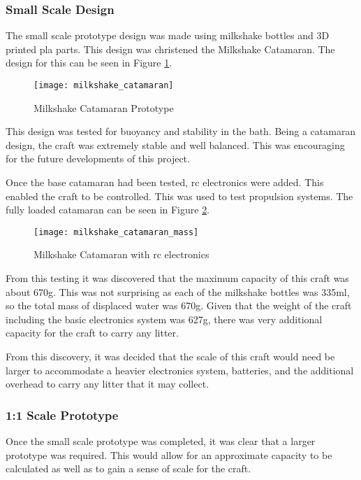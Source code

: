 \documentclass [11pt]{article}
\begin{document}
\subsubsection{Small Scale Design}

The small scale prototype design was made using milkshake bottles and 3D printed \gls{pla} parts. This design was christened the Milkshake Catamaran. The design for this can be seen in Figure \ref{fig:milkshake_catamaran}.

\begin{figure}[H]
\centerline{\texttt{[image: milkshake\_catamaran]}}
\caption{Milkshake Catamaran Prototype}
\label{fig:milkshake_catamaran}
\end{figure}

This design was tested for buoyancy and stability in the bath. Being a \gls{catamaran} design, the craft was extremely stable and well balanced. This was encouraging for the future developments of this project. 

Once the base catamaran had been tested, \gls{rc} electronics were added. This enabled the craft to be controlled. This was used to test propulsion systems. The fully loaded \gls{catamaran} can be seen in Figure \ref{fig:milkshake_catamaran_mass}.   

\begin{figure}[H]
\centerline{\texttt{[image: milkshake\_catamaran\_mass]}}
\caption{Milkshake Catamaran with \gls{rc} electronics}
\label{fig:milkshake_catamaran_mass}
\end{figure}

From this testing it was discovered that the maximum capacity of this craft was about 670g. This was not surprising as each of the milkshake bottles was 335ml, so the total mass of displaced water was 670g. Given that the weight of the craft including the basic electronics system was 627g, there was very additional capacity for the craft to carry any litter.

From this discovery, it was decided that the scale of this craft would need be larger to accommodate a heavier electronics system, batteries, and the additional overhead to carry any litter that it may collect. 

\subsubsection{1:1 Scale Prototype}

Once the small scale prototype was completed, it was clear that a larger prototype was required. This would allow for an approximate capacity to be calculated as well as to gain a sense of scale for the craft. 
\end{document}

